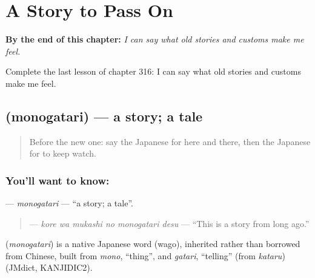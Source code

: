 
\chapter{A Story to Pass On}
\label{ch:ja-a-story-to-pass-on}

\begin{chapteropening}
\textbf{By the end of this chapter:} \emph{I can say what old stories and customs make me feel.}

Complete the last lesson of chapter 316: I can say what old stories and customs make me feel.
\end{chapteropening}

\section[\texorpdfstring{\ja{ものがたり} (monogatari)}{ものがたり (monogatari)}]{ (monogatari) — a story; a tale}

\label{lesson:JA-C316-monogatari}



\begin{quote}
Before the new one: say the Japanese for here and there, then the Japanese for to keep watch.
\end{quote}

\subsection*{You'll want to know: }
\textbf{} — \emph{monogatari} — \textquotedblleft{}a story; a tale\textquotedblright{}.

\begin{quote}
\textbf{  } — \emph{kore wa mukashi no monogatari desu} — \textquotedblleft{}This is a story from long ago.\textquotedblright{}
\end{quote}

\begin{cousinweb}
\textbf{} (\emph{monogatari}) is a native Japanese word (wago), inherited rather than borrowed from Chinese, built from \emph{mono}, \textquotedblleft{}thing\textquotedblright{}, and \emph{gatari}, \textquotedblleft{}telling\textquotedblright{} (from \emph{kataru}) (JMdict, KANJIDIC2).
\end{cousinweb}

